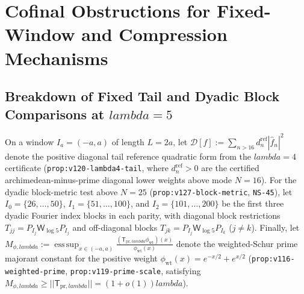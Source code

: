 \documentclass[11pt]{article}
\def\lambda{lambda}%
\def\norm#1{||#1||}%
\theoremstyle{remark}
\newcommand{\norm}[1]{\left\lVert #1\right\rVert}
\begin{document}
\section{Cofinal Obstructions for Fixed-Window and Compression Mechanisms}
\label{sec:obstructions}

\subsection{Breakdown of Fixed Tail and Dyadic Block Comparisons at \texorpdfstring{$\lambda = 5$}{lambda = 5}}
On a window $I_a = (-a,a)$ of length $L = 2a$, let $\mathcal{D}[f] := \sum_{n > 16} d_n^{\mathrm{ref}} |\widehat{f}_n|^2$ denote the positive diagonal tail reference quadratic form from the $\lambda = 4$ certificate (\texttt{prop:v120-lambda4-tail}, where $d_n^{\mathrm{ref}} > 0$ are the certified archimedean-minus-prime diagonal lower weights above mode $N = 16$). For the dyadic block-metric test above $N = 25$ (\texttt{prop:v127-block-metric}, \texttt{NS-45}), let $I_0 = \{26,\dots,50\}$, $I_1 = \{51,\dots,100\}$, and $I_2 = \{101,\dots,200\}$ be the first three dyadic Fourier index blocks in each parity, with diagonal block restrictions $T_{jj} = P_{I_j}\mathsf{W}_{\log 5} P_{I_j}$ and off-diagonal blocks $T_{jk} = P_{I_j}\mathsf{W}_{\log 5} P_{I_k}$ ($j \ne k$). Finally, let $M_{\phi,\lambda} := \operatorname{ess\,sup}_{x \in (-a,a)} \frac{(\mathsf{T}_{\mathrm{pr},\lambda}\phi_{\mathrm{wt}})(x)}{\phi_{\mathrm{wt}}(x)}$ denote the weighted-Schur prime majorant constant for the positive weight $\phi_{\mathrm{wt}}(x) = e^{-x/2} + e^{x/2}$ (\texttt{prop:v116-weighted-prime}, \texttt{prop:v119-prime-scale}, satisfying $M_{\phi,\lambda} \ge \norm{\mathsf{T}_{\mathrm{pr},\lambda}} = (1 + o(1))\lambda$).
\end{document}
